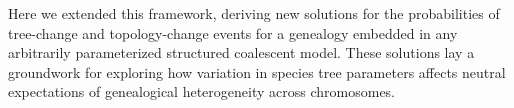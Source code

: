\documentclass[11pt]{article}
\begin{document}
Here we extended this framework, deriving new solutions for the probabilities 
of tree-change and topology-change events for a genealogy embedded 
in any arbitrarily parameterized structured coalescent model. 
These solutions lay a groundwork for exploring how variation in
species tree parameters affects neutral expectations of genealogical 
heterogeneity across chromosomes.



\end{document}
